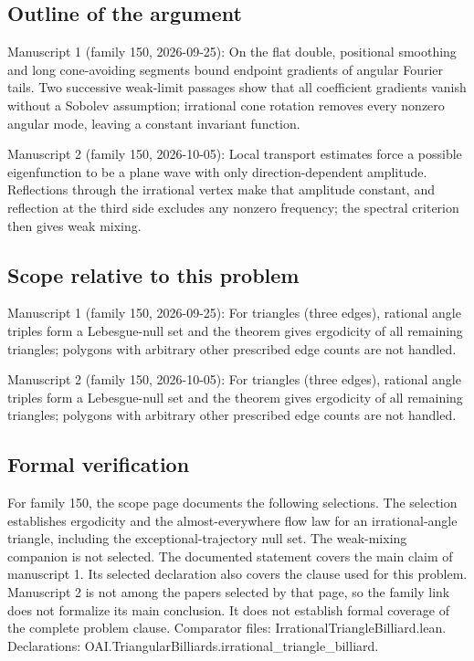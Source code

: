 \documentclass[11pt]{article}
\begin{document}
\subsection{Outline of the argument}
Manuscript 1 (family 150, 2026-09-25): On the flat double, positional smoothing and long cone-avoiding segments bound endpoint gradients of angular Fourier tails. Two successive weak-limit passages show that all coefficient gradients vanish without a Sobolev assumption; irrational cone rotation removes every nonzero angular mode, leaving a constant invariant function.

Manuscript 2 (family 150, 2026-10-05): Local transport estimates force a possible eigenfunction to be a plane wave with only direction-dependent amplitude. Reflections through the irrational vertex make that amplitude constant, and reflection at the third side excludes any nonzero frequency; the spectral criterion then gives weak mixing.

\subsection{Scope relative to this problem}
Manuscript 1 (family 150, 2026-09-25): For triangles (three edges), rational angle triples form a Lebesgue-null set and the theorem gives ergodicity of all remaining triangles; polygons with arbitrary other prescribed edge counts are not handled.

Manuscript 2 (family 150, 2026-10-05): For triangles (three edges), rational angle triples form a Lebesgue-null set and the theorem gives ergodicity of all remaining triangles; polygons with arbitrary other prescribed edge counts are not handled.

\subsection{Formal verification}
For family 150, the scope page documents the following selections. The selection establishes ergodicity and the almost-everywhere flow law for an irrational-angle triangle, including the exceptional-trajectory null set. The weak-mixing companion is not selected. The documented statement covers the main claim of manuscript 1. Its selected declaration also covers the clause used for this problem. Manuscript 2 is not among the papers selected by that page, so the family link does not formalize its main conclusion. It does not establish formal coverage of the complete problem clause. Comparator files: IrrationalTriangleBilliard.lean. Declarations: OAI.TriangularBilliards.irrational\_triangle\_billiard.
\end{document}
